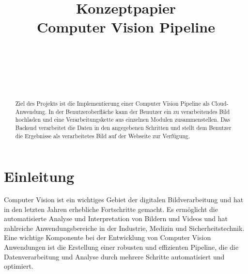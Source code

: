 \documentclass[conference]{IEEEtran}
\begin{document}
\title{Konzeptpapier
	\\Computer Vision Pipeline}

\author{

	\\
	
	\and
	
	\\
	
	\and
	
	\\
	
}


\maketitle

\begin{abstract}
	Ziel des Projekts ist die Implementierung einer Computer Vision Pipeline als Cloud-Anwendung. In der Benutzeroberfläche kann der Benutzer ein zu verarbeitendes Bild hochladen und eine Verarbeitungskette aus einzelnen Modulen zusammenstellen. Das Backend verarbeitet die Daten in den angegebenen Schritten und stellt dem Benutzer die Ergebnisse als verarbeitetes Bild auf der Webseite zur Verfügung.
\end{abstract}


\section{Einleitung}

Computer Vision ist ein wichtiges Gebiet der digitalen Bildverarbeitung und hat in den letzten Jahren erhebliche Fortschritte gemacht. Es ermöglicht die automatisierte Analyse und Interpretation von Bildern und Videos und hat zahlreiche Anwendungsbereiche in der Industrie, Medizin und Sicherheitstechnik. Eine wichtige Komponente bei der Entwicklung von Computer Vision Anwendungen ist die Erstellung einer robusten und effizienten Pipeline, die die Datenverarbeitung und Analyse durch mehrere Schritte automatisiert und optimiert.
\end{document}
